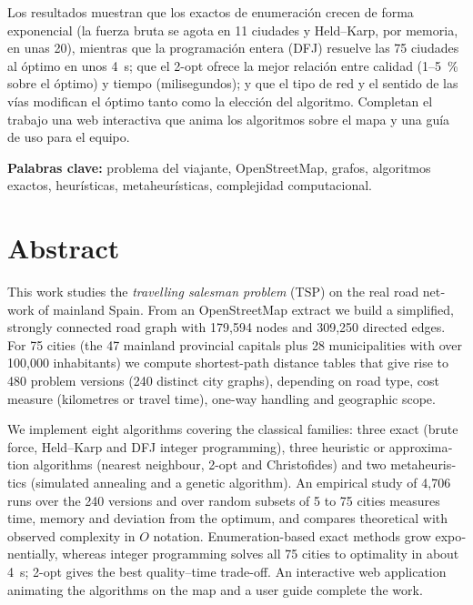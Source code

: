Los resultados muestran que los exactos de enumeración crecen de forma exponencial (la fuerza bruta se agota en 11 ciudades y Held--Karp, por memoria, en
unas 20), mientras que la programación entera (DFJ) resuelve las 75 ciudades al óptimo en unos 4~s; que el 2-opt ofrece la mejor relación entre calidad
(1--5~\% sobre el óptimo) y tiempo (milisegundos); y que el tipo de red y el sentido de las vías modifican el óptimo tanto como la elección del algoritmo.
Completan el trabajo una web interactiva que anima los algoritmos sobre el mapa y una guía de uso para el equipo.

\vspace{1.2em}
\noindent\textbf{Palabras clave:} problema del viajante, OpenStreetMap, grafos, algoritmos exactos, heurísticas, metaheurísticas, complejidad computacional.

\chapter*{Abstract}
\begin{otherlanguage}{english}
This work studies the \emph{travelling salesman problem} (TSP) on the real road network of mainland Spain. From an OpenStreetMap extract we build a simplified,
strongly connected road graph with 179,594 nodes and 309,250 directed edges. For 75 cities (the 47 mainland provincial capitals plus 28 municipalities with
over 100,000 inhabitants) we compute shortest-path distance tables that give rise to 480 problem versions (240 distinct city graphs), depending on road type,
cost measure (kilometres or travel time), one-way handling and geographic scope.

We implement eight algorithms covering the classical families: three exact (brute force, Held--Karp and DFJ integer programming), three heuristic or
approximation algorithms (nearest neighbour, 2-opt and Christofides) and two metaheuristics (simulated annealing and a genetic algorithm). An empirical
study of 4,706 runs over the 240 versions and over random subsets of 5 to 75 cities measures time, memory and deviation from the optimum, and compares
theoretical with observed complexity in $O$ notation. Enumeration-based exact methods grow exponentially, whereas integer programming solves all 75 cities
to optimality in about 4~s; 2-opt gives the best quality--time trade-off. An interactive web application animating the algorithms on the map and a user guide complete the work.
\end{otherlanguage}
\clearpage
